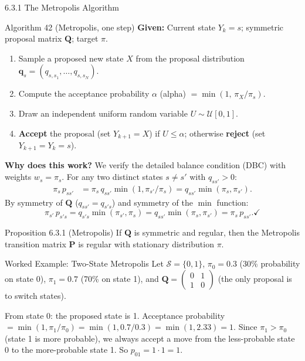 \documentclass[aspectratio=169,10pt]{beamer}
\newcommand{\bfP}{\mathbf{P}}
\newcommand{\bfQ}{\mathbf{Q}}
\begin{document}
\begin{frame}[allowframebreaks]{6.3.1 The Metropolis Algorithm}
\framebreak

\begin{block}{Algorithm 42 (Metropolis, one step)}
\textbf{Given:} Current state $Y_k = s$; symmetric proposal matrix $\bfQ$; target $\pi$.
\begin{enumerate}
  \item Sample a proposed new state $X$ from the proposal distribution $\mathbf{q}_s = (q_{s,s_1}, \ldots, q_{s,s_N})$.
  \item Compute the acceptance probability $\alpha$ (alpha) $= \min\!\left(1,\, \pi_X / \pi_s\right)$.
  \item Draw an independent uniform random variable $U \sim \mathcal{U}[0,1]$.
  \item \textbf{Accept} the proposal (set $Y_{k+1} = X$) if $U \le \alpha$; otherwise \textbf{reject} (set $Y_{k+1} = Y_k = s$).
\end{enumerate}
\end{block}

\textbf{Why does this work?}
We verify the detailed balance condition (DBC) with weights $w_s = \pi_s$.
For any two distinct states $s \neq s'$ with $q_{ss'} > 0$:
\begin{align*}
  \pi_s \, p_{ss'} &= \pi_s \, q_{ss'} \min(1, \pi_{s'}/\pi_s) = q_{ss'} \min(\pi_s, \pi_{s'}).
\end{align*}
By symmetry of $\bfQ$ ($q_{ss'} = q_{s's}$) and symmetry of the $\min$ function:
\[
  \pi_{s'} \, p_{s's} = q_{s's} \min(\pi_{s'}, \pi_s) = q_{ss'} \min(\pi_s, \pi_{s'}) = \pi_s \, p_{ss'}. \checkmark
\]

\begin{block}{Proposition 6.3.1 (Metropolis)}
If $\bfQ$ is symmetric and regular, then the Metropolis transition matrix $\bfP$ is regular with stationary distribution $\pi$.
\end{block}

\framebreak

\begin{exampleblock}{Worked Example: Two-State Metropolis}
Let $\mathcal{S} = \{0,1\}$, $\pi_0 = 0.3$ (30\% probability on state 0), $\pi_1 = 0.7$ (70\% on state 1), and $\bfQ = \begin{pmatrix}0 & 1\\ 1 & 0\end{pmatrix}$ (the only proposal is to switch states).

From state 0: the proposed state is 1. Acceptance probability $= \min(1, \pi_1/\pi_0) = \min(1, 0.7/0.3) = \min(1, 2.33) = 1$.
Since $\pi_1 > \pi_0$ (state 1 is more probable), we always accept a move from the less-probable state 0 to the more-probable state 1. So $p_{01} = 1 \cdot 1 = 1$.


\end{exampleblock}
\end{frame}
\end{document}
